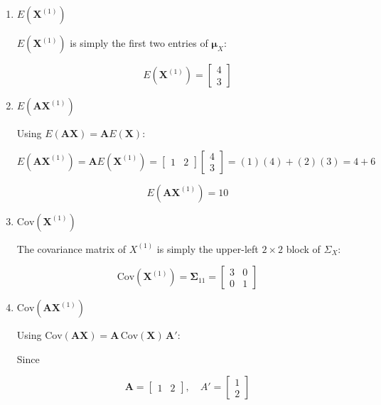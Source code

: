 \documentclass[12pt]{article}
\begin{document}
\begin{enumerate}
\item[(a)] $E(\mathbf{X}^{(1)})$

\vspace{0.5em}

\noindent $E(\mathbf{X}^{(1)})$ is simply the first two entries of $\boldsymbol{\mu}_X$:

$$
\boxed{
E(\mathbf{X}^{(1)}) = \begin{bmatrix} 4 \\ 3 \end{bmatrix}
}
$$

\item[(b)] $E(\mathbf{A}\mathbf{X}^{(1)})$

\vspace{0.5em}

\noindent Using $E(\mathbf{A}\mathbf{X}) = \mathbf{A}E(\mathbf{X})$:

$$
E(\mathbf{A}\mathbf{X}^{(1)}) = \mathbf{A}E(\mathbf{X}^{(1)})
=
\begin{bmatrix} 1 & 2 \end{bmatrix}
\begin{bmatrix} 4 \\ 3 \end{bmatrix}
= (1)(4) + (2)(3) = 4 + 6
$$

$$
\boxed{
E(\mathbf{A}\mathbf{X}^{(1)}) = 10
}
$$

\item[(c)] $\text{Cov}(\mathbf{X}^{(1)})$

\vspace{0.5em}

\noindent The covariance matrix of $X^{(1)}$ is simply the upper-left $2\times2$ block of $\Sigma_X$:

$$
\boxed{
\text{Cov}(\mathbf{X}^{(1)}) = \boldsymbol{\Sigma}_{11} = \begin{bmatrix} 3 & 0 \\ 0 & 1 \end{bmatrix}
}
$$

\item[(d)] $\text{Cov}(\mathbf{A}\mathbf{X}^{(1)})$

\vspace{0.5em}

\noindent Using $\text{Cov}(\mathbf{A}\mathbf{X}) = \mathbf{A}\,\text{Cov}(\mathbf{X})\,\mathbf{A}'$:

Since 

$$
\mathbf{A} = \begin{bmatrix} 1 & 2 \end{bmatrix}, \hspace{1em} A'= \begin{bmatrix} 1 \\ 2 \end{bmatrix}
$$


\end{enumerate}
\end{document}
